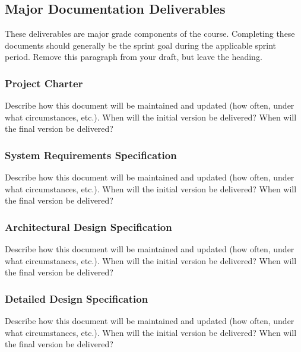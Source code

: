 
\subsection{Major Documentation Deliverables}
These deliverables are major grade components of the course. Completing these documents should generally be the sprint goal during the applicable sprint period. Remove this paragraph from your draft, but leave the heading.

\subsubsection{Project Charter}
Describe how this document will be maintained and updated (how often, under what circumstances, etc.). When will the initial version be delivered? When will the final version be delivered?

\subsubsection{System Requirements Specification}
Describe how this document will be maintained and updated (how often, under what circumstances, etc.). When will the initial version be delivered? When will the final version be delivered?

\subsubsection{Architectural Design Specification}
Describe how this document will be maintained and updated (how often, under what circumstances, etc.). When will the initial version be delivered? When will the final version be delivered?

\subsubsection{Detailed Design Specification}
Describe how this document will be maintained and updated (how often, under what circumstances, etc.). When will the initial version be delivered? When will the final version be delivered?

